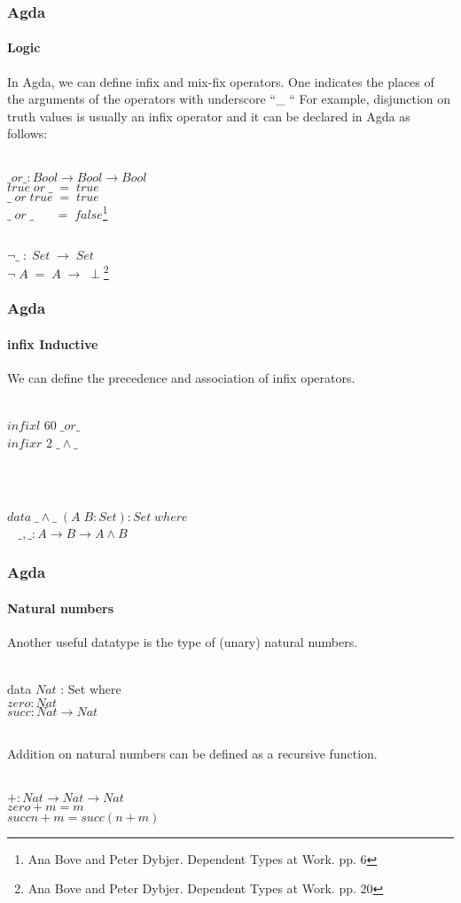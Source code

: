 \documentclass{beamer}
\begin{document}
\begin{frame}
\frametitle{Agda} \framesubtitle{Logic} { \rm In Agda, we can define
  infix and mix-fix operators. One indicates the places of the
  arguments of the operators with underscore ``\_ `` For example,
  disjunction on truth values is usually an infix operator and it can
  be declared in Agda as follows: \\\

$\_ or \_ : Bool \to Bool \to Bool$\\
$true\; or\; \_\; =\; true$ \\
$\_ \;or\; true\; =\; true$ \\
$\_\; or\; \_\;\;\;\;\;\;=\; false$\footnote{{{ \tiny \rm
      Ana Bove and Peter Dybjer. Dependent Types at Work. pp. 6}}} \\\

$\neg\_\; :\; Set\; \to\; Set$\\
$\neg\; A\; =\; A\; \to\; \perp$\footnote{{{ \tiny \rm
      Ana Bove and Peter Dybjer. Dependent Types at Work. pp. 20}}}

}
\end{frame}

\begin{frame}
\frametitle{Agda}
\framesubtitle{infix Inductive}
{ \rm We can define the precedence and association of infix operators.\\\

$infixl$ $60 \; \_ or \_$ \\
$infixr$ $2 \; \_ \wedge \_$}\\\

$data \; \_ \wedge \_ \; (A \; B : Set) : Set \; where$\\
$\;\;$ $ \_,\_ : A \to B \to A \wedge B$

\end{frame}

\begin{frame}
\frametitle{Agda}
\framesubtitle{Natural numbers}
{ \rm Another useful datatype is the type of (unary) natural numbers. \\\

data $Nat$ : Set where \\
$zero : Nat$\\
$succ  : Nat \to Nat$\\\

Addition on natural numbers can be defined as a recursive function. \\\

$+ : Nat \to Nat \to Nat$ \\
$zero  + m = m$ \\
$succ n + m = succ (n + m)$ \\
}
\end{frame}
\end{document}
